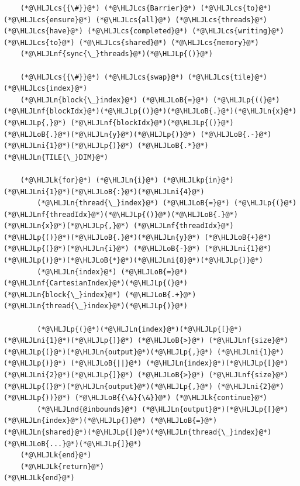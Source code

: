 \documentclass[12pt,a4paper]{article}
\newcommand{\HLJLk}[1]{\textcolor[RGB]{148,91,176}{\textbf{#1}}}
\newcommand{\HLJLkp}[1]{\textcolor[RGB]{148,91,176}{\textbf{#1}}}
\newcommand{\HLJLn}[1]{#1}
\newcommand{\HLJLnd}[1]{\textcolor[RGB]{214,102,97}{#1}}
\newcommand{\HLJLnf}[1]{\textcolor[RGB]{66,102,213}{#1}}
\newcommand{\HLJLni}[1]{\textcolor[RGB]{59,151,46}{#1}}
\newcommand{\HLJLoB}[1]{\textcolor[RGB]{102,102,102}{\textbf{#1}}}
\newcommand{\HLJLp}[1]{#1}
\newcommand{\HLJLcs}[1]{\textcolor[RGB]{153,153,119}{\textit{#1}}}
\begin{document}
\begin{lstlisting}
    (*@\HLJLcs{{\#}}@*) (*@\HLJLcs{Barrier}@*) (*@\HLJLcs{to}@*) (*@\HLJLcs{ensure}@*) (*@\HLJLcs{all}@*) (*@\HLJLcs{threads}@*) (*@\HLJLcs{have}@*) (*@\HLJLcs{completed}@*) (*@\HLJLcs{writing}@*) (*@\HLJLcs{to}@*) (*@\HLJLcs{shared}@*) (*@\HLJLcs{memory}@*)
    (*@\HLJLnf{sync{\_}threads}@*)(*@\HLJLp{()}@*)
    
    (*@\HLJLcs{{\#}}@*) (*@\HLJLcs{swap}@*) (*@\HLJLcs{tile}@*) (*@\HLJLcs{index}@*)
    (*@\HLJLn{block{\_}index}@*) (*@\HLJLoB{=}@*) (*@\HLJLp{((}@*)(*@\HLJLnf{blockIdx}@*)(*@\HLJLp{()}@*)(*@\HLJLoB{.}@*)(*@\HLJLn{x}@*)(*@\HLJLp{,}@*) (*@\HLJLnf{blockIdx}@*)(*@\HLJLp{()}@*)(*@\HLJLoB{.}@*)(*@\HLJLn{y}@*)(*@\HLJLp{)}@*) (*@\HLJLoB{.-}@*) (*@\HLJLni{1}@*)(*@\HLJLp{)}@*) (*@\HLJLoB{.*}@*) (*@\HLJLn{TILE{\_}DIM}@*)
    
    (*@\HLJLk{for}@*) (*@\HLJLn{i}@*) (*@\HLJLkp{in}@*) (*@\HLJLni{1}@*)(*@\HLJLoB{:}@*)(*@\HLJLni{4}@*) 
        (*@\HLJLn{thread{\_}index}@*) (*@\HLJLoB{=}@*) (*@\HLJLp{(}@*)(*@\HLJLnf{threadIdx}@*)(*@\HLJLp{()}@*)(*@\HLJLoB{.}@*)(*@\HLJLn{x}@*)(*@\HLJLp{,}@*) (*@\HLJLnf{threadIdx}@*)(*@\HLJLp{()}@*)(*@\HLJLoB{.}@*)(*@\HLJLn{y}@*) (*@\HLJLoB{+}@*) (*@\HLJLp{(}@*)(*@\HLJLn{i}@*) (*@\HLJLoB{-}@*) (*@\HLJLni{1}@*)(*@\HLJLp{)}@*)(*@\HLJLoB{*}@*)(*@\HLJLni{8}@*)(*@\HLJLp{)}@*)
        (*@\HLJLn{index}@*) (*@\HLJLoB{=}@*) (*@\HLJLnf{CartesianIndex}@*)(*@\HLJLp{(}@*)(*@\HLJLn{block{\_}index}@*) (*@\HLJLoB{.+}@*) (*@\HLJLn{thread{\_}index}@*)(*@\HLJLp{)}@*)
        
        (*@\HLJLp{(}@*)(*@\HLJLn{index}@*)(*@\HLJLp{[}@*)(*@\HLJLni{1}@*)(*@\HLJLp{]}@*) (*@\HLJLoB{>}@*) (*@\HLJLnf{size}@*)(*@\HLJLp{(}@*)(*@\HLJLn{output}@*)(*@\HLJLp{,}@*) (*@\HLJLni{1}@*)(*@\HLJLp{)}@*) (*@\HLJLoB{||}@*) (*@\HLJLn{index}@*)(*@\HLJLp{[}@*)(*@\HLJLni{2}@*)(*@\HLJLp{]}@*) (*@\HLJLoB{>}@*) (*@\HLJLnf{size}@*)(*@\HLJLp{(}@*)(*@\HLJLn{output}@*)(*@\HLJLp{,}@*) (*@\HLJLni{2}@*)(*@\HLJLp{))}@*) (*@\HLJLoB{{\&}{\&}}@*) (*@\HLJLk{continue}@*)
        (*@\HLJLnd{@inbounds}@*) (*@\HLJLn{output}@*)(*@\HLJLp{[}@*)(*@\HLJLn{index}@*)(*@\HLJLp{]}@*) (*@\HLJLoB{=}@*) (*@\HLJLn{shared}@*)(*@\HLJLp{[}@*)(*@\HLJLn{thread{\_}index}@*)(*@\HLJLoB{...}@*)(*@\HLJLp{]}@*)
    (*@\HLJLk{end}@*)
    (*@\HLJLk{return}@*)
(*@\HLJLk{end}@*)


\end{lstlisting}
\end{document}

